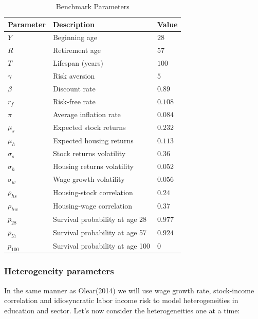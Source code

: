 \documentclass[]{elsarticle}
\begin{document}
\begin{table}
	\centering
	\caption{Benchmark Parameters}
	\begin{tabular}[c]{lll}
		\hline
		Parameter&Description&Value\\
		\hline
		$Y$&Beginning age&$28$\\
		$R$&Retirement age&$57$\\
		$T$&Lifespan (years)&$100$\\
		$\gamma$&Risk aversion&$5$\\
		$\beta$&Discount rate&$0.89$\\
		$r_f$&Risk-free rate&$0.108$\\
		$\pi$&Average inflation rate&$0.084$\\
		\hline
		$\mu_s$&Expected stock returns&$0.232$\\
		$\mu_h$&Expected housing returns&$0.113$\\
		$\sigma_s$&Stock returns volatility&$0.36$\\
		$\sigma_h$&Housing returns volatility&$0.052$\\
		$\sigma_w$&Wage growth volatility&$0.056$\\
		$\rho_{hs}$&Housing-stock correlation&$0.24$\\
		$\rho_{hw}$&Housing-wage correlation&$0.37$\\
		\hline
		$p_{28}$&Survival probability at age 28&$0.977$\\
		$p_{57}$&Survival probability at age 57&$0.924$\\
		$p_{100}$&Survival probability at age 100&$0$\\	
		\hline
	\end{tabular}
\end{table}


\subsubsection{Heterogeneity parameters}
In the same manner as Olear(2014) we will use wage growth rate, stock-income correlation and idiosyncratic labor income risk to model heterogeneities in education and sector. Let's now consider the heterogeneities one at a time:
\end{document}

